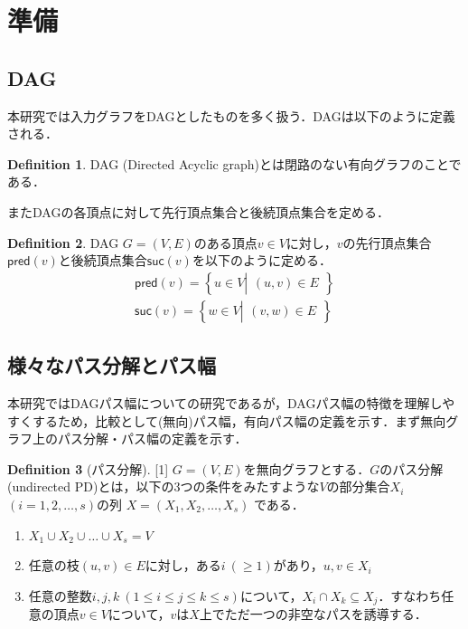 \documentclass[master]{kuisthesis}		%
\theoremstyle{plain}
\theoremstyle{definition}
\newtheorem{definition*}{Definition}
\begin{document}
\section{準備} %


\subsection{DAG} %
本研究では入力グラフをDAGとしたものを多く扱う．DAGは以下のように定義される．

\begin{definition*}
    DAG (Directed Acyclic graph)とは閉路のない有向グラフのことである．
\end{definition*}

またDAGの各頂点に対して先行頂点集合と後続頂点集合を定める．


\begin{definition*}
    DAG $G=(V, E)$のある頂点$v \in V$に対し，$v$の先行頂点集合$\mathsf{pred}(v)$と後続頂点集合$\mathsf{suc}(v)$を以下のように定める．
    \begin{align*}
        \mathsf{pred}(v) = \left\{ u \in V \left |
        \begin{array}{l}
            \text{$(u, v) \in E$}
        \end{array}
        \right. \right\}\\
        \mathsf{suc}(v) = \left\{ w \in V \left |
        \begin{array}{l}
            \text{$(v, w) \in E$}
        \end{array}
        \right. \right\}
    \end{align*}
    
\end{definition*}




\subsection{様々なパス分解とパス幅} %
本研究ではDAGパス幅についての研究であるが，DAGパス幅の特徴を理解しやすくするため，比較として(無向)パス幅，有向パス幅の定義を示す．まず無向グラフ上のパス分解・パス幅の定義を示す．

\begin{definition*}[パス分解][1]
    $G=(V, E)$を無向グラフとする．$G$のパス分解(undirected PD)とは，以下の3つの条件をみたすような$V$の部分集合$X_i$ $(i = 1, 2,  \dots, s)$の列 $X=(X_1, X_2,  \dots, X_s)$ である．
    
    \begin{enumerate}
        \item $ X_1 \cup X_2 \cup \dots \cup X_s = V $ 
        \item 任意の枝$(u, v) \in E $に対し，ある$i\ (\geq 1)$があり，$u, v \in X_i$
        \item 任意の整数$ i, j, k\ (1 \leq i \leq j \leq k \leq s)$について，$X_i \cap X_k \subseteq X_j$．すなわち任意の頂点$v \in V$について，$v$は$X$上でただ一つの非空なパスを誘導する．
    \end{enumerate}
\end{definition*}
\end{document}
